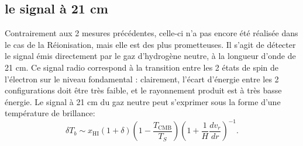 
\subsection{le signal à 21 cm}
 Contrairement aux 2 mesures précédentes, celle-ci n'a pas encore été réalisée dans le cas de la Réionisation, mais elle est des plus prometteuses. Il s'agit de détecter le signal émis directement par le gaz d'hydrogène neutre, à la longueur d'onde de 21 cm. Ce signal radio correspond à la transition entre les 2 états de spin de l'électron sur le niveau fondamental : clairement, l'écart d'énergie entre les 2 configurations doit être très faible, et le rayonnement produit est à très basse énergie. Le signal à 21 cm du gaz neutre peut s'exprimer sous la forme d'une température de brillance:
 \begin{equation}
 \delta T_b \sim x_\mathrm{HI} (1+\delta) (1-\frac{T_\mathrm{CMB}}{T_S})(1+\frac{1}{H}\frac{d v_r}{dr})^{-1}.
 \end{equation}
